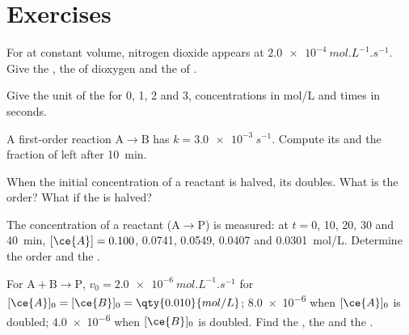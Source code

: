 \section{Exercises}

\begin{exercise}[$\star$]\label{exo:b1:rate-laws:1}
For  at constant volume, nitrogen dioxide appears at
$\qty{2.0e-4}{mol.L^{-1}.s^{-1}}$. Give the , the  of dioxygen and the  of .
\end{exercise}

\begin{exercise}[$\star$]\label{exo:b1:rate-laws:2}
Give the unit of the  for  0, 1, 2 and 3,
concentrations in \unit{mol/L} and times in seconds.
\end{exercise}

\begin{exercise}[$\star$]\label{exo:b1:rate-laws:3}
A first-order reaction $\mathrm{A} \longrightarrow \mathrm{B}$ has $k = \qty{3.0e-3}{s^{-1}}$. Compute
its  and the fraction of  left after \qty{10}{min}.
\end{exercise}

\begin{exercise}[$\star$]\label{exo:b1:rate-laws:4}
When the initial concentration of a reactant is halved, its 
doubles. What is the order? What if the  is halved?
\end{exercise}

\begin{exercise}[$\star\star$]\label{exo:b1:rate-laws:5}
The concentration of a reactant  ($\mathrm{A} \longrightarrow \mathrm{P}$) is measured: at $t
= 0$, 10, 20, 30 and \qty{40}{min}, $[\ce{A}] = 0.100$, 0.0741, 0.0549,
0.0407 and \qty{0.0301}{mol/L}. Determine the order and the .
\end{exercise}

\begin{exercise}[$\star\star$]\label{exo:b1:rate-laws:6}
For $\mathrm{A} + \mathrm{B} \longrightarrow \mathrm{P}$, $v_0 = \qty{2.0e-6}{mol.L^{-1}.s^{-1}}$ for $[\ce{A}]_0
= [\ce{B}]_0 = \qty{0.010}{mol/L}$; \qty{8.0e-6}{} when $[\ce{A}]_0$ is
doubled; \qty{4.0e-6}{} when $[\ce{B}]_0$ is doubled. Find the , the  and the .
\end{exercise}

